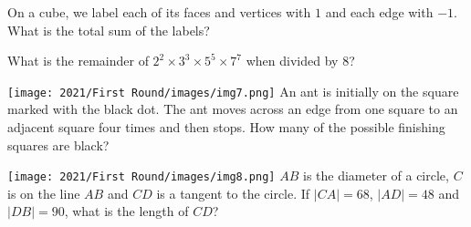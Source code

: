 \documentclass{article}
\begin{document}
\begin{problem}
On a cube, we label each of its faces and vertices with $1$ and each edge with $-1$. What is the total sum of the labels?
\end{problem}
\begin{tasks}
\end{tasks}

\begin{problem}
What is the remainder of $2^2 \times 3^3 \times 5^5 \times 7^7$ when divided by $8$?
\end{problem}
\begin{tasks}
\end{tasks}

\begin{problem}
\texttt{[image: 2021/First Round/images/img7.png]}
An ant is initially on the square marked with the black dot. The ant moves across an edge from one square to an adjacent square four times and then stops. How many of the possible finishing squares are black?
\end{problem}

\begin{problem}
\texttt{[image: 2021/First Round/images/img8.png]}
$AB$ is the diameter of a circle, $C$ is on the line $AB$ and $CD$ is a tangent to the circle. If $|CA|=68$, $|AD|=48$ and $|DB|=90$, what is the length of $CD$?
\end{problem}
\end{document}
